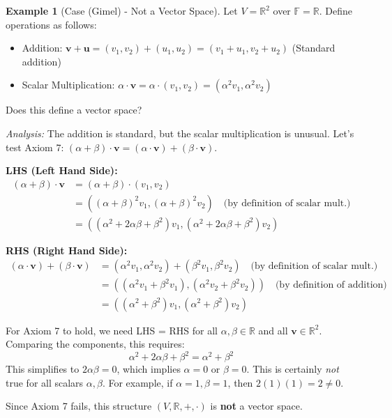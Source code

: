 \documentclass[11pt]{article}
\theoremstyle{definition}
\newtheorem{example}[theorem]{Example}
\theoremstyle{remark}
\newcommand{\field}[1]{\mathbb{#1}} %
\newcommand{\R}{\field{R}}
\newcommand{\F}{\field{F}} %
\newcommand{\veca}[1]{\mathbf{#1}} %
\begin{document}
\begin{example}[Case (Gimel) - Not a Vector Space] \label{ex:vs_fail}
Let $V = \R^2$ over $\F = \R$. Define operations as follows:
\begin{itemize}
    \item Addition: $\veca{v} + \veca{u} = (v_1, v_2) + (u_1, u_2) = (v_1+u_1, v_2+u_2)$ (Standard addition)
    \item Scalar Multiplication: $\alpha \cdot \veca{v} = \alpha \cdot (v_1, v_2) = (\alpha^2 v_1, \alpha^2 v_2)$
\end{itemize}
Does this define a vector space?

\textit{Analysis:} The addition is standard, but the scalar multiplication is unusual. Let's test Axiom 7: $(\alpha + \beta) \cdot \veca{v} = (\alpha \cdot \veca{v}) + (\beta \cdot \veca{v})$.

\textbf{LHS (Left Hand Side):}
\begin{align*} (\alpha + \beta) \cdot \veca{v} &= (\alpha + \beta) \cdot (v_1, v_2) \\ &= ((\alpha + \beta)^2 v_1, (\alpha + \beta)^2 v_2) \quad \text{(by definition of scalar mult.)} \\ &= ((\alpha^2 + 2\alpha\beta + \beta^2) v_1, (\alpha^2 + 2\alpha\beta + \beta^2) v_2) \end{align*}

\textbf{RHS (Right Hand Side):}
\begin{align*} (\alpha \cdot \veca{v}) + (\beta \cdot \veca{v}) &= (\alpha^2 v_1, \alpha^2 v_2) + (\beta^2 v_1, \beta^2 v_2) \quad \text{(by definition of scalar mult.)} \\ &= ( (\alpha^2 v_1 + \beta^2 v_1), (\alpha^2 v_2 + \beta^2 v_2) ) \quad \text{(by definition of addition)} \\ &= ( (\alpha^2 + \beta^2) v_1, (\alpha^2 + \beta^2) v_2 ) \end{align*}

For Axiom 7 to hold, we need LHS = RHS for all $\alpha, \beta \in \R$ and all $\veca{v} \in \R^2$. Comparing the components, this requires:
\[ \alpha^2 + 2\alpha\beta + \beta^2 = \alpha^2 + \beta^2 \]
This simplifies to $2\alpha\beta = 0$, which implies $\alpha=0$ or $\beta=0$. This is certainly \emph{not} true for all scalars $\alpha, \beta$. For example, if $\alpha=1, \beta=1$, then $2(1)(1) = 2 \neq 0$.

Since Axiom 7 fails, this structure $(V, \R, +, \cdot)$ is \textbf{not} a vector space.
\end{example}
\end{document}

